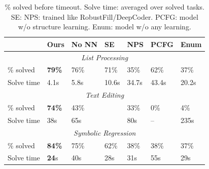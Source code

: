 \documentclass{article}
\newcommand{\expect}{\mathds{E}} %
\newcommand{\probability}{\mathds{P}} %
\begin{document}
\begin{table}
\tabcolsep=4pt
\renewcommand{\arraystretch}{0.5}
\begin{tabular}{lllllll}
  \toprule& Ours& 
    No NN
& SE&NPS & PCFG & Enum



  \\\midrule\multicolumn{7}{c}{\emph{List Processing}}\\\midrule
  \% solved&\textbf{79\%} &76\% &71\%&35\%&62\%&37\%\\
  Solve time&  4.1s&5.8s&10.6s&34.7s&43.4s&20.2s

  \\\midrule\multicolumn{7}{c}{\emph{Text Editing}}\\\midrule
  \% solved&\textbf{74\%} &43\% &&33\%&0\%&4\%\\
  Solve time&  38s&65s&&80s&--&235s


  \\\midrule\multicolumn{7}{c}{\emph{Symbolic Regression}}\\\midrule
  \% solved&   \textbf{84\% }&75\%&62\%&38\%&38\%&37\% \\
  Solve time&  \textbf{24}s& 40s  &28s&31s&55s&29s

  \\\bottomrule
  \end{tabular}
\caption{\% solved before timeout. Solve time: averaged over solved
  tasks.  SE: NPS: trained like RobustFill/DeepCoder.  PCFG: model w/o
  structure learning.  Enum: model w/o any learning.  %
}\vspace{-0.5cm}\label{baselineComparisons} \end{table}
\end{document}
